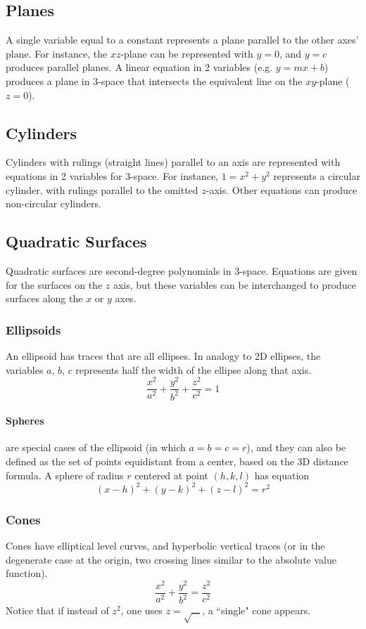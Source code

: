 \documentclass{article}
\begin{document}
\subsection{Planes}
A single variable equal to a constant represents a plane parallel to the other axes' plane. For instance, the $xz$-plane can be represented with $y=0$, and $y=c$ produces parallel planes.
A linear equation in 2 variables (e.g. $y=mx+b$) produces a plane in 3-space that intersects the equivalent line on the $xy$-plane ($z=0$).

\subsection{Cylinders}
Cylinders with rulings (straight lines) parallel to an axis are represented with equations in 2 variables for 3-space.
For instance, $1 = x^2 + y^2$ represents a circular cylinder, with rulings parallel to the omitted $z$-axis.
Other equations can produce non-circular cylinders.

\subsection{Quadratic Surfaces}
Quadratic surfaces are second-degree polynomials in 3-space. Equations are given for the surfaces on the $z$ axis, but these variables can be interchanged to produce surfaces along the $x$ or $y$ axes.

\subsubsection{Ellipsoids}
An ellipsoid has traces that are all ellipses. In analogy to 2D ellipses, the variables $a$, $b$, $c$ represents half the width of the ellipse along that axis.
$$\frac{x^2}{a^2} + \frac{y^2}{b^2}+\frac{z^2}{c^2}=1$$
\paragraph{Spheres} are special cases of the ellipsoid (in which $a=b=c=r$), and they can also be defined as the set of points equidistant from a center, based on the 3D distance formula. A sphere of radius $r$ centered at point $(h, k, l)$ has equation
$$(x-h)^2+(y-k)^2+(z-l)^2=r^2$$

\subsubsection{Cones}
Cones have elliptical level curves, and hyperbolic vertical traces (or in the degenerate case at the origin, two crossing lines similar to the absolute value function).
$$\frac{x^2}{a^2} + \frac{y^2}{b^2} = \frac{z^2}{c^2}$$
Notice that if instead of $z^2$, one uses $z=\sqrt{\ldots}$, a ``single" cone appears.
\end{document}
